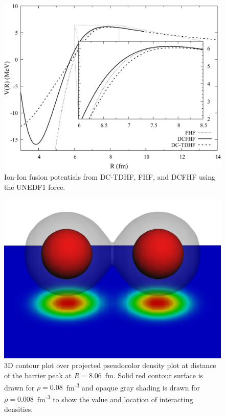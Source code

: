 \begin{figure}
	\includegraphics*[width=\textwidth]{../Figures/CC/PotentialsComp.pdf}
	\caption{Ion-Ion fusion potentials from DC-TDHF, FHF, and DCFHF using the UNEDF1 force.}
	\label{fig:pots}
\end{figure}
\begin{figure}
	\includegraphics*[width=\textwidth]{../Figures/CC/12C12CColl.pdf}
	\caption{3D contour plot over projected pseudocolor density plot at distance of the barrier peak at $R=8.06$~fm. Solid red contour surface is drawn for $\rho = 0.08$~fm\textsuperscript{-3} and opaque gray shading is drawn for $\rho = 0.008$~fm\textsuperscript{-3} to show the value and location of interacting densities.}
	\label{fig:dens}
\end{figure}
